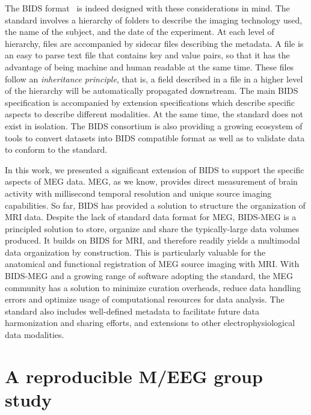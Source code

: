 The \ac{BIDS} format~\citep{gorgolewski2016brain} is indeed designed with these considerations in mind. 
The standard involves a hierarchy of folders to describe the imaging technology used, the name of the subject, and the date of the experiment. 
At each level of hierarchy, files are accompanied by sidecar  files describing the metadata. 
A  file is an easy to parse text file that contains key and value pairs, so that it has the advantage of being machine and human readable at the same time. 
These files follow an \emph{inheritance principle}, that is, a field described in a  file in a higher level of the hierarchy will be automatically propagated downstream. 
The main BIDS specification is accompanied by extension specifications which describe specific aspects to describe different modalities.
At the same time, the standard does not exist in isolation.
The \ac{BIDS} consortium is also providing a growing ecosystem of tools to convert datasets into \ac{BIDS} compatible format as well as to validate data to conform to the standard. 

In this work, we presented a significant extension of \ac{BIDS} to support the specific aspects of \ac{MEG} data. \Ac{MEG}, as we know, provides direct measurement of brain activity with millisecond temporal resolution and unique source imaging capabilities. So far, \ac{BIDS} has provided a solution to structure the organization of \ac{MRI} data. Despite the lack of standard data format for \ac{MEG}, BIDS-MEG is a principled solution to store, organize and share the typically-large data volumes produced. It builds on \ac{BIDS} for \ac{MRI}, and therefore readily yields a multimodal data organization by construction. This is particularly valuable for the anatomical and functional registration of \ac{MEG} source imaging with \ac{MRI}. With BIDS-MEG and a growing range of software adopting the standard, the \ac{MEG} community has a solution to minimize curation overheads, reduce data handling errors and optimize usage of computational resources for data analysis. The standard also includes well-defined metadata to facilitate future data harmonization and sharing efforts, and extensions to other electrophysiological data modalities.

\clearpage
\section*{A reproducible M/EEG group study}

